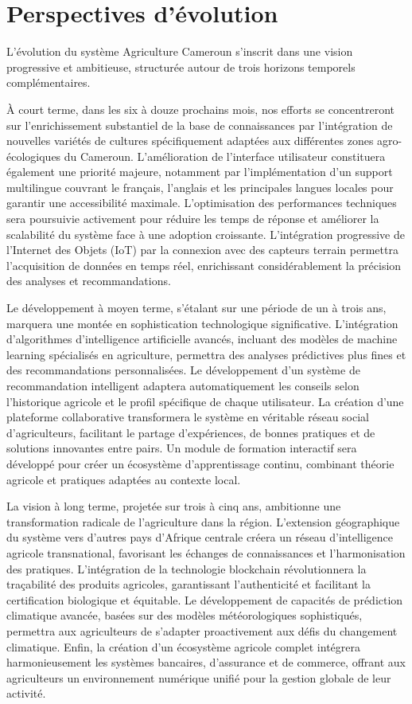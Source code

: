 \section*{Perspectives d'évolution}

L'évolution du système Agriculture Cameroun s'inscrit dans une vision progressive et ambitieuse, structurée autour de trois horizons temporels complémentaires.

À court terme, dans les six à douze prochains mois, nos efforts se concentreront sur l'enrichissement substantiel de la base de connaissances par l'intégration de nouvelles variétés de cultures spécifiquement adaptées aux différentes zones agro-écologiques du Cameroun. L'amélioration de l'interface utilisateur constituera également une priorité majeure, notamment par l'implémentation d'un support multilingue couvrant le français, l'anglais et les principales langues locales pour garantir une accessibilité maximale. L'optimisation des performances techniques sera poursuivie activement pour réduire les temps de réponse et améliorer la scalabilité du système face à une adoption croissante. L'intégration progressive de l'Internet des Objets (IoT) par la connexion avec des capteurs terrain permettra l'acquisition de données en temps réel, enrichissant considérablement la précision des analyses et recommandations.

Le développement à moyen terme, s'étalant sur une période de un à trois ans, marquera une montée en sophistication technologique significative. L'intégration d'algorithmes d'intelligence artificielle avancés, incluant des modèles de machine learning spécialisés en agriculture, permettra des analyses prédictives plus fines et des recommandations personnalisées. Le développement d'un système de recommandation intelligent adaptera automatiquement les conseils selon l'historique agricole et le profil spécifique de chaque utilisateur. La création d'une plateforme collaborative transformera le système en véritable réseau social d'agriculteurs, facilitant le partage d'expériences, de bonnes pratiques et de solutions innovantes entre pairs. Un module de formation interactif sera développé pour créer un écosystème d'apprentissage continu, combinant théorie agricole et pratiques adaptées au contexte local.

La vision à long terme, projetée sur trois à cinq ans, ambitionne une transformation radicale de l'agriculture dans la région. L'extension géographique du système vers d'autres pays d'Afrique centrale créera un réseau d'intelligence agricole transnational, favorisant les échanges de connaissances et l'harmonisation des pratiques. L'intégration de la technologie blockchain révolutionnera la traçabilité des produits agricoles, garantissant l'authenticité et facilitant la certification biologique et équitable. Le développement de capacités de prédiction climatique avancée, basées sur des modèles météorologiques sophistiqués, permettra aux agriculteurs de s'adapter proactivement aux défis du changement climatique. Enfin, la création d'un écosystème agricole complet intégrera harmonieusement les systèmes bancaires, d'assurance et de commerce, offrant aux agriculteurs un environnement numérique unifié pour la gestion globale de leur activité.

